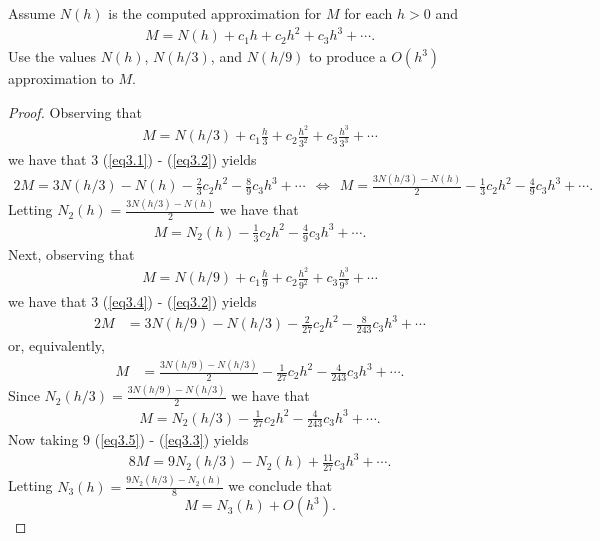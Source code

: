 \documentclass[8pt]{article}
\theoremstyle{definition}
\newenvironment{exercise}[1]
  {\renewcommand\theinnerexercise{#1}\innerexercise}
  {\endinnerexercise}
\begin{document}
\begin{exercise}{3}
Assume $N(h)$ is the computed approximation for $M$ for each $h > 0$ and 
\begin{align}
M = N(h) + c_1 h + c_2 h^2 + c_3 h^3 + \cdots. \label{eq3.1}
\end{align}
Use the values $N(h)$, $N(h/3)$, and $N(h/9)$ to produce a $O(h^3)$ approximation to $M$.
\end{exercise}

\begin{proof}
Observing that
\begin{align}
M = N(h/3) + c_1 \frac{h}{3} + c_2 \frac{h^2}{3^2} + c_3 \frac{h^3}{3^3} + \cdots \label{eq3.2}
\end{align}
we have that 3 (\ref{eq3.1}) - (\ref{eq3.2}) yields
\begin{align}
2M = 3 N(h/3) - N(h) - \frac{2}{3} c_2 h^2 - \frac{8}{9} c_3 h^3 + \cdots \ \ \Longleftrightarrow \ \ M = \frac{3 N(h/3) - N(h)}{2} - \frac{1}{3} c_2 h^2 - \frac{4}{9} c_3 h^3 + \cdots. \nonumber
\end{align}
Letting $N_2 (h) = \frac{3 N(h/3) - N(h)}{2}$ we have that 
\begin{align}
M = N_2 (h) - \frac{1}{3} c_2 h^2 - \frac{4}{9} c_3 h^3 + \cdots. \label{eq3.3}
\end{align}
Next, observing that
\begin{align}
M = N(h/9) + c_1 \frac{h}{9} + c_2 \frac{h^2}{9^2} + c_3 \frac{h^3}{9^3} + \cdots \label{eq3.4}
\end{align}
we have that 3 (\ref{eq3.4}) - (\ref{eq3.2}) yields
\begin{align}
2M &= 3 N(h/9) - N(h/3) - \frac{2}{27} c_2 h^2 - \frac{8}{243} c_3 h^3 + \cdots \nonumber
\end{align}
or, equivalently,
\begin{align}
M &= \frac{3 N(h/9) - N(h/3)}{2} - \frac{1}{27} c_2 h^2 - \frac{4}{243} c_3 h^3 + \cdots. \nonumber
\end{align}
Since $N_2 (h/3) = \frac{3 N(h/9) - N(h/3)}{2}$ we have that 
\begin{align}
M = N_2 (h/3) - \frac{1}{27} c_2 h^2 - \frac{4}{243} c_3 h^3 + \cdots. \label{eq3.5}
\end{align}
Now taking 9 (\ref{eq3.5}) - (\ref{eq3.3}) yields
\begin{align}
8M = 9 N_2 (h/3) - N_2 (h) + \frac{11}{27} c_3 h^3 + \cdots. \nonumber
\end{align}
Letting $N_3 (h) = \frac{9 N_2 (h/3) - N_2 (h)}{8}$ we conclude that $$M = N_3 (h) + O (h^3).$$
\end{proof}
\newpage
\end{document}
